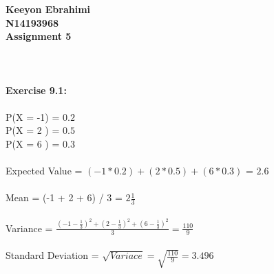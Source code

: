 \documentclass[11pt]{article}
\begin{document}
\textbf{Keeyon Ebrahimi}\\
\textbf{N14193968}\\
\textbf{Assignment 5}\\
\\ \\ \\
\textbf{Exercise 9.1:}\\
\\
P(X = -1) = $0.2$\\
P(X = 2 ) = $0.5$\\
P(X = 6 ) = $0.3$ \\
\\
Expected Value = $(-1 * 0.2) + (2 * 0.5) + (6 * 0.3)$ = \textbf{$2.6$} 
\\\\
Mean = (-1 + 2 + 6) / 3 = $2\frac{1}{3}$
\\\\
Variance = {\huge $\frac{(-1 - \frac{1}{3}) ^ 2 + (2 - \frac{1}{3}) ^ 2 + (6 - \frac{1}{3}) ^ 2}{3} = \frac{110}{9}$ }
\\\\
Standard Deviation = {\large $\sqrt{Variace} = \sqrt{\frac{110}{9}} = 3.496 $ }
\newpage
\end{document}
